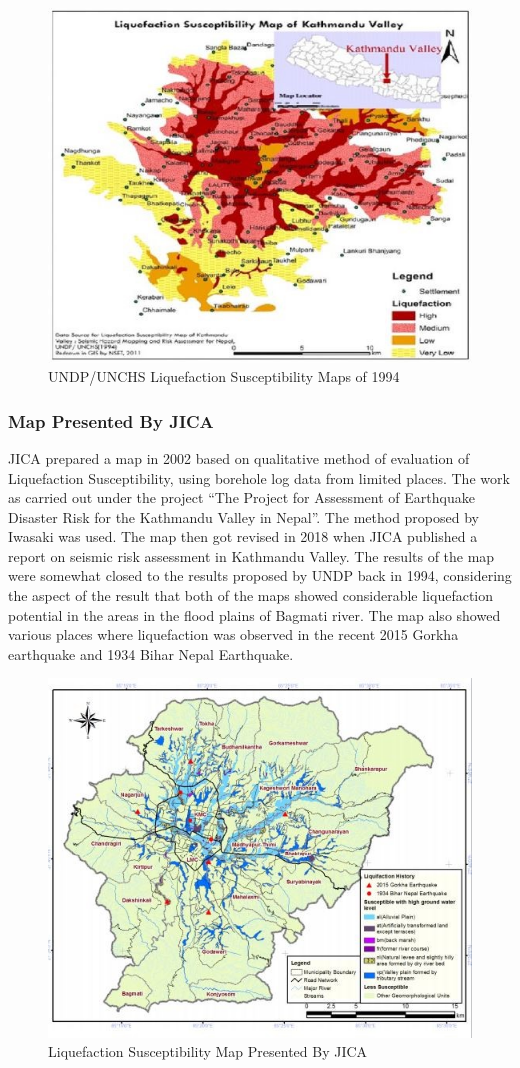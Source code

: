 \begin{figure}[!hbt]
\centering
\includegraphics[width=0.5\linewidth,keepaspectratio]{images/main/undp_susceptibility.jpg}
\caption{UNDP/UNCHS Liquefaction Susceptibility Maps of 1994}
\end{figure}

\subsubsection{Map Presented By JICA}

JICA prepared a map in 2002 based on qualitative method of evaluation of Liquefaction Susceptibility, using borehole log data from limited places. The work as carried out under the project “The Project for Assessment of Earthquake Disaster Risk for the Kathmandu Valley in Nepal”. The method proposed by Iwasaki \cite{r26} was used. The map then got revised in 2018 when JICA published a report on seismic risk assessment in Kathmandu Valley. The results of the map were somewhat closed to the results proposed by UNDP back in 1994, considering the aspect of the result that both of the maps showed considerable liquefaction potential in the areas in the flood plains of Bagmati river. The map also showed various places where liquefaction was observed in the recent 2015 Gorkha earthquake and 1934 Bihar Nepal Earthquake.

\begin{figure}[!hbt]
\centering
\includegraphics[width=0.5\linewidth,keepaspectratio]{images/main/jica_sus.jpg}
\caption{Liquefaction Susceptibility Map Presented By JICA}
\end{figure}

